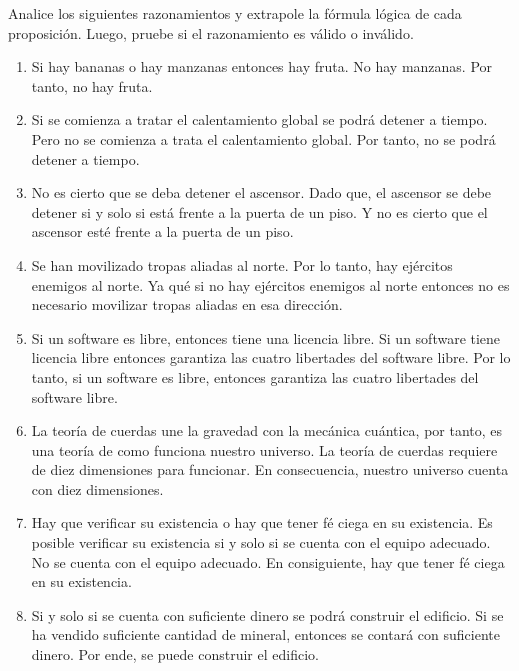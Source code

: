\begin{exercise}
    Analice los siguientes razonamientos y extrapole la fórmula lógica de cada
    proposición. Luego, pruebe si el razonamiento es válido o inválido.

    \begin{enumerate}[a]
        \item Si hay bananas o hay manzanas entonces hay fruta. No hay manzanas.
        Por tanto, no hay fruta.

        \item Si se comienza a tratar el calentamiento global se podrá detener a
        tiempo. Pero no se comienza a trata el calentamiento global. Por tanto,
        no se podrá detener a tiempo.

        \item No es cierto que se deba detener el ascensor. Dado que, el
        ascensor se debe detener si y solo si está frente a la puerta de un
        piso. Y no es cierto que el ascensor esté frente a la puerta de un piso.

        \item Se han movilizado tropas aliadas al norte. Por lo tanto, hay
        ejércitos enemigos al norte. Ya qué si no hay ejércitos enemigos al
        norte entonces no es necesario movilizar tropas aliadas en esa
        dirección.

        \item Si un software es libre, entonces tiene una licencia libre. Si un
        software tiene licencia libre entonces garantiza las cuatro libertades
        del software libre. Por lo tanto, si un software es libre, entonces
        garantiza las cuatro libertades del software libre.

        \item La teoría de cuerdas une la gravedad con la mecánica cuántica, por
        tanto, es una teoría de como funciona nuestro universo. La teoría de
        cuerdas requiere de diez dimensiones para funcionar. En consecuencia,
        nuestro universo cuenta con diez dimensiones.

        \item Hay que verificar su existencia o hay que tener fé ciega en su
        existencia. Es posible verificar su existencia si y solo si se cuenta
        con el equipo adecuado. No se cuenta con el equipo adecuado. En
        consiguiente, hay que tener fé ciega en su existencia.

        \item Si y solo si se cuenta con suficiente dinero se podrá construir el
        edificio. Si se ha vendido suficiente cantidad de mineral, entonces se
        contará con suficiente dinero. Por ende, se puede construir el edificio.


\end{enumerate}
\end{exercise}
